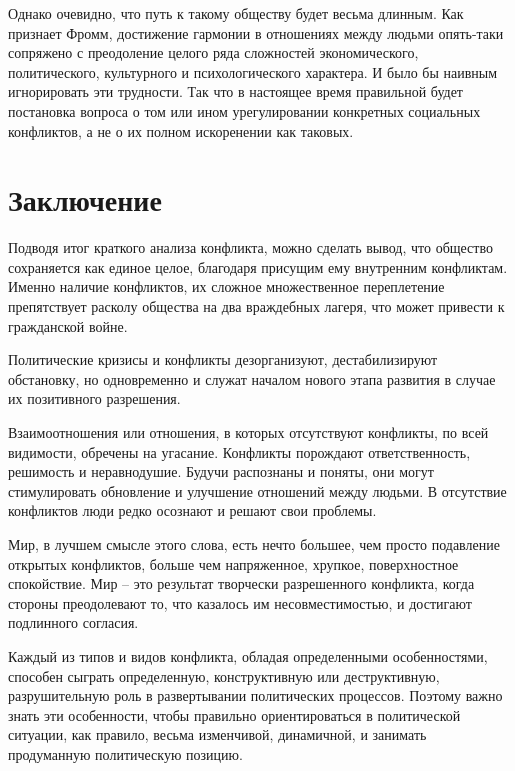 Однако очевидно, что путь к такому обществу будет весьма длинным. Как признает
Фромм, достижение гармонии в отношениях между людьми опять-таки сопряжено с
преодоление целого ряда сложностей экономического, политического, культурного и
психологического характера. И было бы наивным игнорировать эти трудности. Так
что в настоящее время правильной будет постановка вопроса о том или ином
урегулировании конкретных социальных конфликтов, а не о их полном искоренении
как таковых.

\pagebreak %

\chapter*{Заключение}

Подводя итог краткого анализа конфликта, можно сделать вывод, что общество
сохраняется как единое целое, благодаря присущим ему внутренним конфликтам.
Именно наличие конфликтов, их сложное множественное переплетение препятствует
расколу общества на два враждебных лагеря, что может привести к гражданской
войне.

Политические кризисы и конфликты дезорганизуют, дестабилизируют обстановку, но
одновременно и служат началом нового этапа развития в случае их позитивного
разрешения.

Взаимоотношения или отношения, в которых отсутствуют конфликты, по всей
видимости, обречены на угасание. Конфликты порождают ответственность, решимость
и неравнодушие. Будучи распознаны и поняты, они могут стимулировать обновление
и улучшение отношений между людьми. В отсутствие конфликтов люди редко осознают
и решают свои проблемы.

Мир, в лучшем смысле этого слова, есть нечто большее, чем просто подавление
открытых конфликтов, больше чем напряженное, хрупкое, поверхностное
спокойствие. Мир -- это результат творчески разрешенного конфликта, когда
стороны преодолевают то, что казалось им несовместимостью, и достигают
подлинного согласия.

Каждый из типов и видов конфликта, обладая определенными особенностями,
способен сыграть определенную, конструктивную или деструктивную, разрушительную
роль в развертывании политических процессов. Поэтому важно знать эти
особенности, чтобы правильно ориентироваться в политической ситуации, как
правило, весьма изменчивой, динамичной, и занимать продуманную политическую
позицию.

